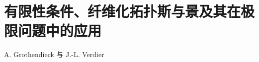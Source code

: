 \setcounter{chapter}{5}
\chapter{有限性条件、纤维化拓扑斯与景及其在极限问题中的应用}
\begin{center}A. Grothendieck 与 J.-L. Verdier\end{center}
\label{sga4.exp.VI}



